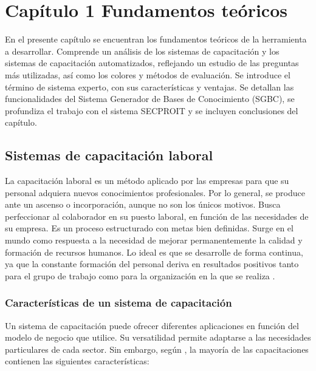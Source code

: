 \chapter*{Capítulo 1 \vspace{0.5cm} \break Fundamentos teóricos}
\setcounter{chapter}{1}

En el presente capítulo se encuentran los fundamentos teóricos de la herramienta a desarrollar. Comprende un análisis de los sistemas de capacitación y los sistemas de capacitación automatizados, reflejando un estudio de las preguntas más utilizadas, así como los colores y métodos de evaluación. Se introduce el término de sistema experto, con sus características y ventajas. Se detallan las funcionalidades del Sistema Generador de Bases de Conocimiento (SGBC), se profundiza el trabajo con el sistema SECPROIT y se incluyen conclusiones del capítulo.


\section{Sistemas de capacitación laboral}
La capacitación laboral es un método aplicado por las empresas para que su personal adquiera nuevos conocimientos profesionales. Por lo general, se produce ante un ascenso o incorporación, aunque no son los únicos motivos. Busca perfeccionar al colaborador en su puesto laboral, en función de las necesidades de su empresa. Es un proceso estructurado con metas bien definidas. Surge en el mundo como respuesta a la necesidad de mejorar permanentemente la calidad y formación de recursos humanos. Lo ideal es que se desarrolle de forma continua, ya que la constante formación del personal deriva en resultados positivos tanto para el grupo de trabajo como para la organización en la que se realiza \cite{Denby2010}.

\subsection{Características de un sistema de capacitación}
Un sistema de capacitación puede ofrecer diferentes aplicaciones en función del modelo de negocio que utilice. Su versatilidad permite adaptarse a las necesidades particulares de cada sector. Sin embargo, según \cite{Paez2022}, la mayoría de las capacitaciones contienen las siguientes características:

